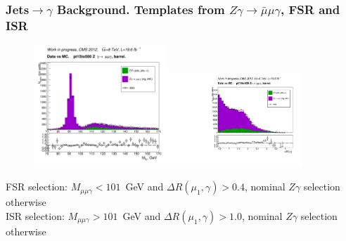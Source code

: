 \begin{frame}\frametitle{Jets$\rightarrow \gamma$ Background. Templates from $Z\gamma\rightarrow{\bar{\mu}}\mu\gamma$, FSR and ISR}
  \begin{figure}[htb]
    \begin{center}
       \includegraphics[width=0.45\textwidth]{../figs/figs_v11/MUON_ZGamma/PrepareYields/c_TotalDATAvsMC_Barrel__MpholeplepVERY_PRELIMINARY_pt15to500_.png}\includegraphics[width=0.45\textwidth]{../figs/figs_v11/MUON_ZGamma/PrepareYields/c_TotalDATAvsMC_Barrel__lep1PhoDeltaRVERY_PRELIMINARY_pt15to500_.pdf}\\
    \end{center}
  \end{figure}
\scriptize
FSR selection: $M_{\mu\mu\gamma}<101$~GeV and $\Delta R(\mu_{1},\gamma)>0.4$, nominal $Z\gamma$ selection otherwise\\
ISR selection: $M_{\mu\mu\gamma}>101$~GeV and $\Delta R(\mu_{1},\gamma)>1.0$, nominal $Z\gamma$ selection otherwise
\end{frame}%

